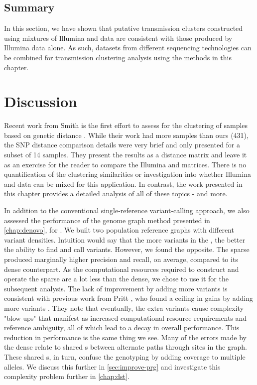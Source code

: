 \subsection{Summary}

In this section, we have shown that putative transmission clusters constructed using mixtures of Illumina and \ont{} data are consistent with those produced by Illumina data alone. As such, datasets from different sequencing technologies can be combined for transmission clustering analysis using the methods in this chapter.


\section{Discussion}

Recent work from Smith \etal{} is the first effort to assess \ont{} for the clustering of \mtb{} samples based on genetic distance \cite{smith2020}. While their work had more samples than ours (431), the SNP distance comparison details were very brief and only presented for a subset of 14 samples. They present the results as a distance matrix and leave it as an exercise for the reader to compare the Illumina and \ont{} matrices. There is no quantification of the clustering similarities or investigation into whether Illumina and \ont{} data can be mixed for this application. In contrast, the work presented in this chapter provides a detailed analysis of all of these topics - and more.

In addition to the conventional single-reference variant-calling approach, we also assessed the performance of the genome graph method presented in \autoref{chap:denovo}, for \mtb{}. We built two \mtb{} population reference graphs with different variant densities. Intuition would say that the more variants in the \prg{}, the better the ability to find and call variants. However, we found the opposite. The sparse \prg{} produced marginally higher precision and recall, on average, compared to its dense counterpart. As the computational resources required to construct and operate the sparse \prg{} are a lot less than the dense, we chose to use it for the subsequent analysis. The lack of improvement by adding more variants is consistent with previous work from Pritt \etal{}, who found a ceiling in gains by adding more variants \cite{pritt2018}. They note that eventually, the extra variants cause complexity "blow-ups" that manifest as increased computational resource requirements and reference ambiguity, all of which lead to a decay in overall performance. This reduction in performance is the same thing we see. Many of the errors made by the dense \prg{} relate to shared \kmer{}s between alternate paths through sites in the graph. These shared \kmer{}s, in turn, confuse the genotyping by adding coverage to multiple alleles. We discuss this further in \autoref{sec:improve-prg} and investigate this complexity problem further in \autoref{chap:dst}.

